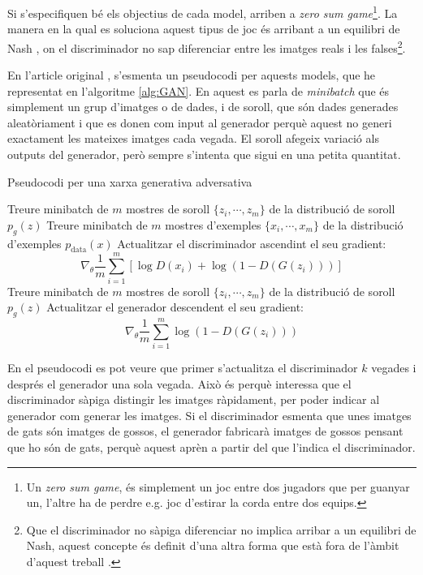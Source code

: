 Si s'especifiquen bé els objectius de cada model, arriben a \textit{zero sum game}\footnote{Un \textit{zero sum game}, és simplement un joc entre dos jugadors que per guanyar un, l'altre ha de perdre e.g. joc d'estirar la corda entre dos equips.}. La manera en la qual es soluciona aquest tipus de joc és arribant a un equilibri de Nash \cite{QGAN_exp}, on el discriminador no sap diferenciar entre les imatges reals i les falses\footnote{Que el discriminador no sàpiga diferenciar no implica arribar a un equilibri de Nash, aquest concepte és definit d'una altra forma que està fora de l'àmbit d'aquest treball \cite{GAN2014}.}.

En l'article original \cite{GAN2014}, s'esmenta un pseudocodi per aquests models, que he representat en l'algoritme \ref{alg:GAN}. En aquest es parla de \textit{minibatch} que és simplement un grup d'imatges o de dades, i de soroll, que són dades generades aleatòriament i que es donen com input al generador perquè aquest no generi exactament les mateixes imatges cada vegada. El soroll afegeix variació als outputs del generador, però sempre s'intenta que sigui en una petita quantitat.

\begin{algorithm}[H]
	\caption{Pseudocodi per una xarxa generativa adversativa}\label{alg:GAN}
	\begin{algorithmic}
		\State Treure minibatch de $m$ mostres de soroll $\{z_i, \cdots, z_m\}$ de la distribució de soroll $p_g(z)$
		\State Treure minibatch de $m$ mostres d'exemples $\{x_i, \cdots, x_m\}$ de la distribució d'exemples $p_{\mathrm{data}}(x)$
		\State Actualitzar el discriminador ascendint el seu gradient: 
		$$
		\nabla_\theta \frac{1}{m}\sum_{i=1}^{m}\left[\log D(x_i) + \log(1- D(G(z_i)))\right]
		$$
		\EndFor
		\State Treure minibatch de $m$ mostres de soroll $\{z_i, \cdots, z_m\}$ de la distribució de soroll $p_g(z)$
		\State Actualitzar el generador descendent el seu gradient:
		$$
		\nabla_\theta \frac{1}{m} \sum_{i=1}^{m} \log(1-D(G(z_i)))
		$$
		\EndFor
	\end{algorithmic}

\end{algorithm}

En el pseudocodi es pot veure que primer s'actualitza el discriminador $k$ vegades i després  el generador una sola vegada. Això és perquè interessa que el discriminador sàpiga distingir les imatges ràpidament, per poder indicar al generador com generar les imatges. Si el discriminador esmenta que unes imatges de gats són imatges de gossos, el generador fabricarà imatges de gossos pensant que ho són de gats, perquè aquest aprèn a partir del que l'indica el discriminador.

